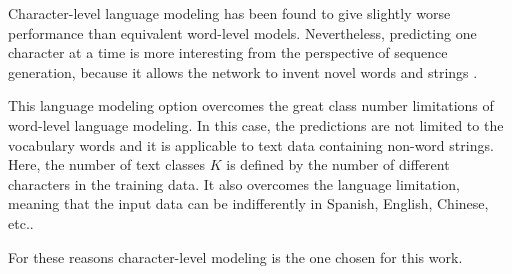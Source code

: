 Character-level language modeling has been found to give slightly worse performance than equivalent word-level models. Nevertheless, predicting one character at a time is more interesting from the perspective of sequence generation, because it allows the network to invent novel words and strings \cite{graves2013generating}. 

This language modeling option overcomes the great class number limitations of word-level language modeling. In this case, the predictions are not limited to the vocabulary words and it is applicable to text data containing non-word strings. Here, the number of text classes $K$ is defined by the number of different characters in the training data. It also overcomes the language limitation, meaning that the input data can be indifferently in Spanish, English, Chinese, etc.. 

For these reasons character-level modeling is the one chosen for this work.

 


